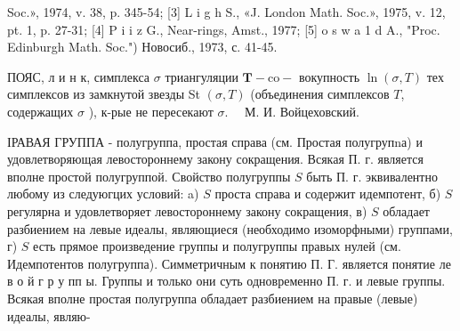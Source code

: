 \documentclass[10pt]{article}
\begin{document}
Soc.», 1974, v. 38, p. 345-54; [3] L i g h S., «J. London Math. Soc.», 1975, v. 12, pt. 1, p. 27-31; [4] P i i z G., Near-rings, Amst., 1977; [5] o s w a 1 d A., "Proc. Edinburgh Math. Soc.") Новосиб., 1973, с. 41-45.



ПОЯС, л и н к, симплекса $\sigma$ триангуляции $\boldsymbol{T}-\mathrm{co-}$ вокупность $\ln (\sigma, T)$ тех симплексов из замкнутой звезды St $(\sigma, T)$ (объединения симплексов $T$, содержащих $\sigma$ ), к-рые не пересекают $\sigma . \quad$ М. И. Войцеховский.



ІРАВАЯ ГРУППА - полугруппа, простая справа (см. Простая полугрупnа) и удовлетворяющая левостороннему закону сокращения. Всякая П. г. является вполне простой полугруппой. Свойство полугруппы $S$ быть П. г. эквивалентно любому из следуюгцих условий: a) $S$ проста справа и содержит идемпотент, б) $S$ регулярна и удовлетворяет левостороннему закону сокращения, в) $S$ обладает разбиением на левые идеалы, являющиеся (необходимо изоморфными) группами, г) $S$ есть прямое произведение группы и полугруппы правых нулей (см. Идемпотентов полугруппа). Симметричным к понятию П. Г. является понятие ле в о й г р у пп ы. Группы и только они суть одновременно П. г. и левые группы. Всякая вполне простая полугруппа обладает разбиением на правые (левые) идеалы, являю-
\end{document}
